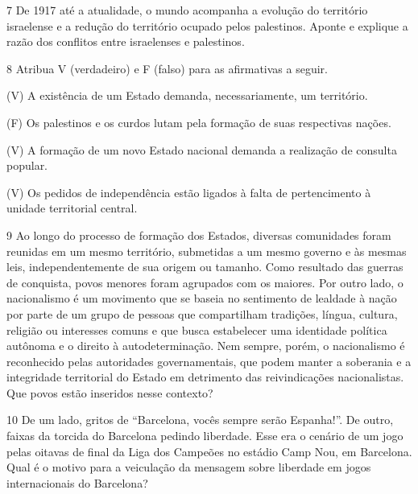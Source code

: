 
\num{7} De 1917 até a atualidade, o mundo acompanha a evolução do
território israelense e a redução do território ocupado pelos
palestinos. Aponte e explique a razão dos conflitos entre israelenses e
palestinos.


\num{8} Atribua V (verdadeiro) e F (falso) para as afirmativas a seguir.

(V) A existência de um Estado demanda, necessariamente, um território.

(F) Os palestinos e os curdos lutam pela formação de suas respectivas
nações.

(V) A formação de um novo Estado nacional demanda a realização de
consulta popular.

(V) Os pedidos de independência estão ligados à falta de pertencimento à
unidade territorial central.

\num{9} Ao longo do processo de formação dos Estados, diversas
comunidades foram reunidas em um mesmo território, submetidas a um mesmo
governo e às mesmas leis, independentemente de sua origem ou tamanho.
Como resultado das guerras de conquista, povos menores foram agrupados
com os maiores. Por outro lado, o nacionalismo é um movimento que se
baseia no sentimento de lealdade à nação por parte de um grupo de
pessoas que compartilham tradições, língua, cultura, religião ou
interesses comuns e que busca estabelecer uma identidade política
autônoma e o direito à autodeterminação. Nem sempre, porém, o
nacionalismo é reconhecido pelas autoridades governamentais, que podem
manter a soberania e a integridade territorial do Estado em detrimento
das reivindicações nacionalistas. Que povos estão inseridos nesse
contexto?


\num{10} De um lado, gritos de ``Barcelona, vocês sempre serão
Espanha!''. De outro, faixas da torcida do Barcelona pedindo liberdade.
Esse era o cenário de um jogo pelas oitavas de final da Liga dos
Campeões no estádio Camp Nou, em Barcelona. Qual é o motivo para a
veiculação da mensagem sobre liberdade em jogos internacionais do
Barcelona?

